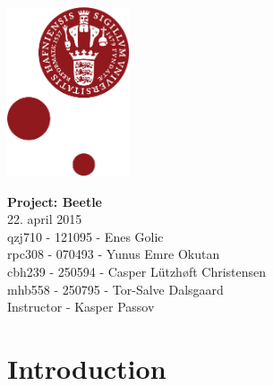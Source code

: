 \documentclass[12pt,a4paper]{article}
\begin{document}
	
	\begin{minipage}[b]{1.0\linewidth} 
				\includegraphics[height=50mm]{KULogo.pdf}
		
		\vspace*{-16ex}
		\vspace {35ex}
		\begin{center}
			{\huge \bf Project: Beetle} \vspace*{4ex} \\
			{\large 22. april 2015}\\
			\vspace*{2ex}
			qzj710 - 121095 - Enes Golic \\
			rpc308 - 070493 - Yunus Emre Okutan \\
			cbh239 - 250594 - Casper Lützhøft Christensen \\
			mhb558 - 250795 - Tor-Salve Dalsgaard\\
			\vspace*{1ex}
			Instructor - Kasper Passov
			
		\end{center}
	\end{minipage}
	
\newpage
\tableofcontents

\newpage
\section{Introduction}
\end{document}
